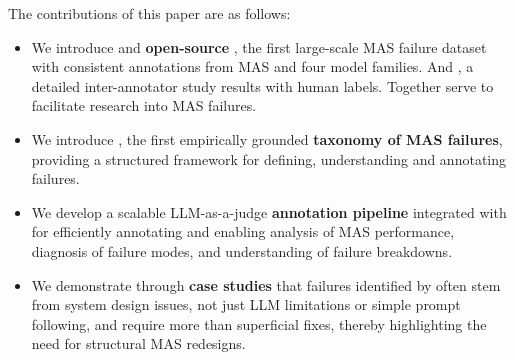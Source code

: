 The contributions of this paper are as follows:
\begin{itemize}[leftmargin=*, nosep]
    \item We introduce and \textbf{open-source} \dataset{}, the first large-scale MAS failure dataset with consistent annotations from \numMASDomain MAS and four model families. And \datasetHuman{}, a detailed inter-annotator study results with human labels. Together serve to facilitate research into MAS failures.
    \item We introduce \taxnomony{}, the first empirically grounded \textbf{taxonomy of MAS failures}, providing a structured framework for defining, understanding and annotating failures.
    \item We develop a scalable LLM-as-a-judge \textbf{annotation pipeline} integrated with \taxonomy{} for efficiently annotating \dataset{} and enabling analysis of MAS performance, diagnosis of failure modes, and understanding of failure breakdowns.
    \item We demonstrate through \textbf{case studies} that failures identified by \taxonomy{} often stem from system design issues, not just LLM limitations or simple prompt following, and require more than superficial fixes, thereby highlighting the need for structural MAS redesigns.
\end{itemize}

